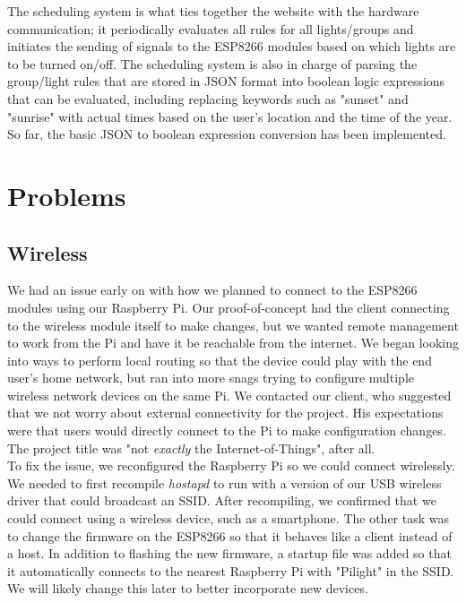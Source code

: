 \documentclass[oneside,openright]{book}
\begin{document}
The scheduling system is what ties together the website with the hardware
communication; it periodically evaluates all rules for all lights/groups and
initiates the sending of signals to the ESP8266 modules based on which lights
are to be turned on/off.  The scheduling system is also in charge of parsing
the group/light rules that are stored in JSON format into boolean logic
expressions that can be evaluated, including replacing keywords such as
"sunset" and "sunrise" with actual times based on the user's location and the
time of the year.  So far, the basic JSON to boolean expression conversion has
been implemented.

\section{Problems}

\subsection{Wireless}

We had an issue early on with how we planned to connect to the ESP8266 modules
using our Raspberry Pi. Our proof-of-concept had the client connecting to the
wireless module itself to make changes, but we wanted remote management to work
from the Pi and have it be reachable from the internet. We began looking into
ways to perform local routing so that the device could play with the end user's
home network, but ran into more snags trying to configure multiple wireless
network devices on the same Pi. We contacted our client, who suggested that we
not worry about external connectivity for the project. His expectations were
that users would directly connect to the Pi to make configuration changes. The
project title was "not \textit{exactly} the Internet-of-Things", after all.\\

To fix the issue, we reconfigured the Raspberry Pi so we could connect
wirelessly. We needed to first recompile \textit{hostapd} to run with a version
of our USB wireless driver that could broadcast an SSID. After recompiling, we
confirmed that we could connect using a wireless device, such as a smartphone.
The other task was to change the firmware on the ESP8266 so that it behaves
like a client instead of a host. In addition to flashing the new firmware, a
startup file was added so that it automatically connects to the nearest
Raspberry Pi with "Pilight" in the SSID. We will likely change this later to
better incorporate new devices.
\end{document}

